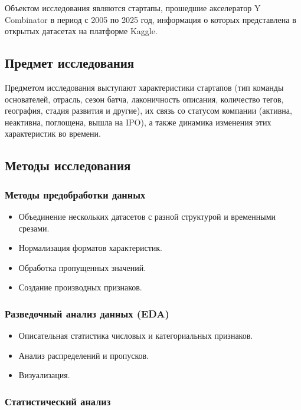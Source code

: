 Объектом исследования являются стартапы, прошедшие акселератор Y Combinator в период с 2005 по 2025 год, информация о которых представлена в открытых датасетах на платформе Kaggle.

\subsection{Предмет исследования}

Предметом исследования выступают характеристики стартапов (тип команды основателей, отрасль, сезон батча, лаконичность описания, количество тегов, география, стадия развития и другие), их связь со статусом компании (активна, неактивна, поглощена, вышла на IPO), а также динамика изменения этих характеристик во времени.

\subsection{Методы исследования}

\subsubsection{Методы предобработки данных}

\begin{itemize}
    \item Объединение нескольких датасетов с разной структурой и временными срезами.
    \item Нормализация форматов характеристик.
    \item Обработка пропущенных значений.
    \item Создание производных признаков.
\end{itemize}

\subsubsection{Разведочный анализ данных (EDA)}

\begin{itemize}
    \item Описательная статистика числовых и категориальных признаков.
    \item Анализ распределений и пропусков.
    \item Визуализация.
\end{itemize}

\subsubsection{Статистический анализ}

